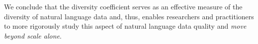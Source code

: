 We conclude that the diversity coefficient serves as an effective measure of the diversity of natural language data and, thus, enables researchers and practitioners to more rigorously study this aspect of natural language data quality and \textit{move beyond scale alone}. 



